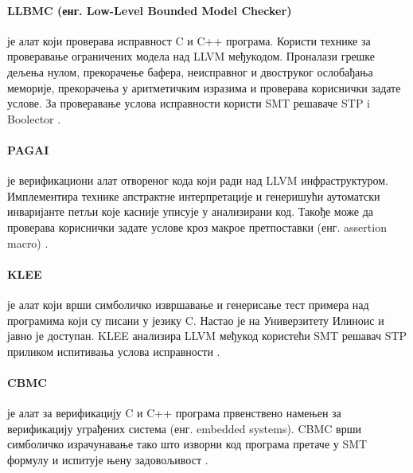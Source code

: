 \documentclass[12pt,oneside]{memoir}
\begin{document}
\paragraph{ LLBMC (енг. Low-Level Bounded Model Checker)} је алат који проверава исправност 
C и C++ програма. Користи технике за проверавање ограничених модела над LLVM међукодом. Проналази грешке дељења нулом, прекорачење бафера, неисправног и двоструког ослобађања меморије, прекорачења у аритметичким изразима и проверава кориснички задате услове. За проверавање услова исправности користи SMT решаваче STP i Boolector \cite{llbmc}.

\paragraph{PAGAI} је верификациони алат отвореног кода који ради над LLVM инфраструктуром. Имплементира технике апстрактне интерпретације и  генеришући аутоматски инваријанте петљи које касније уписује у анализирани код.  Такође може да проверава кориснички задате услове кроз макрое претпоставки (енг. assertion macro) \cite{pagai}.

\paragraph{KLEE} је алат који врши симболичко извршавање и генерисање тест примера над програмима који су писани у језику C. Настао је на Универзитету Илиноис и јавно је доступан. KLEE анализира LLVM међукод користећи SMT решавач STP приликом испитивања услова исправности \cite{klee}. 

\paragraph{CBMC} је алат за верификацију C и C++ програма првенствено намењен за верификацију уграђених система (енг. embedded systems). CBMC врши симболичко израчунавање тако што изворни код програма претаче у SMT формулу и испитује њену задовољивост \cite{cbmc}. 
\end{document}
